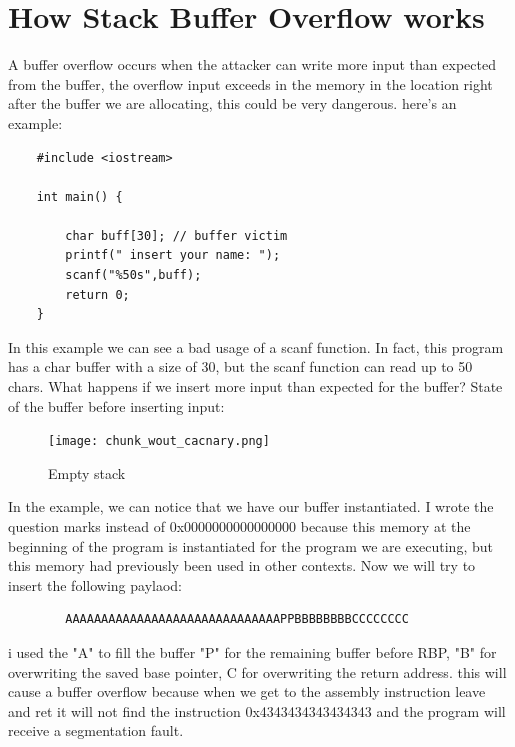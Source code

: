 \documentclass{report}
\begin{document}
    \section{How Stack Buffer Overflow works}
    A buffer overflow occurs when the attacker can write more input than expected from the buffer, the overflow input exceeds in the memory in the location right after the buffer we are allocating, this could be very dangerous.\newline
    here's an example:
    \begin{verbatim}
    #include <iostream>
    
    int main() {
    
        char buff[30]; // buffer victim 
        printf(" insert your name: ");
        scanf("%50s",buff); 
        return 0;
    }
    \end{verbatim}
    In this example we can see a bad usage of a scanf function. In fact, this program has a char buffer with a size of 30, but the scanf function can read up to 50 chars.\newline 
    What happens if we insert more input than expected for the buffer?\newline
    State of the buffer before inserting input:\newline
    \begin{figure}[h]
    \centering
    \texttt{[image: chunk\_wout\_cacnary.png]}
    \caption{Empty stack}
    \label{fig:example_empty_buffer}
    \end{figure}
       \clearpage
    In the example, we can notice that we have our buffer instantiated.\newline
    I wrote the question marks instead of 0x0000000000000000 because this memory at the beginning of the program is instantiated for the program we are executing, but this memory had previously been used in other contexts.\newline
    Now we will try to insert the following paylaod:
    \begin{verbatim}
        AAAAAAAAAAAAAAAAAAAAAAAAAAAAAAPPBBBBBBBBCCCCCCCC
    \end{verbatim}
    i used the "A" to fill the buffer "P" for the remaining buffer before RBP, "B" for overwriting the saved base pointer,
    C for overwriting the return address.
    this will cause a buffer overflow because when we get to the assembly instruction leave and ret it will not find the instruction 0x4343434343434343 and the program will receive a segmentation fault.
\end{document}
